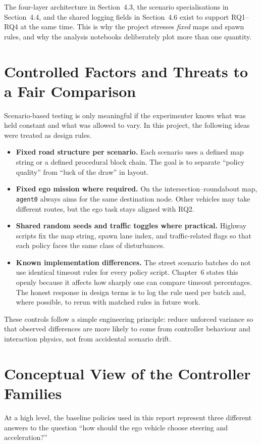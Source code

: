 \documentclass[12pt,a4paper]{report}
\begin{document}
The four-layer architecture in Section~4.3, the scenario specialisations in Section~4.4, and the shared logging fields in Section~4.6 exist to support RQ1--RQ4 at the same time. This is why the project stresses \emph{fixed} maps and spawn rules, and why the analysis notebooks deliberately plot more than one quantity.

\section{Controlled Factors and Threats to a Fair Comparison}
Scenario-based testing is only meaningful if the experimenter knows what was held constant and what was allowed to vary. In this project, the following ideas were treated as design rules.

\begin{itemize}
    \item \textbf{Fixed road structure per scenario.} Each scenario uses a defined map string or a defined procedural block chain. The goal is to separate ``policy quality'' from ``luck of the draw'' in layout.
    \item \textbf{Fixed ego mission where required.} On the intersection--roundabout map, \texttt{agent0} always aims for the same destination node. Other vehicles may take different routes, but the ego task stays aligned with RQ2.
    \item \textbf{Shared random seeds and traffic toggles where practical.} Highway scripts fix the map string, spawn lane index, and traffic-related flags so that each policy faces the same class of disturbances.
    \item \textbf{Known implementation differences.} The street scenario batches do not use identical timeout rules for every policy script. Chapter~6 states this openly because it affects how sharply one can compare timeout percentages. The honest response in design terms is to log the rule used per batch and, where possible, to rerun with matched rules in future work.
\end{itemize}

These controls follow a simple engineering principle: reduce unforced variance so that observed differences are more likely to come from controller behaviour and interaction physics, not from accidental scenario drift.

\section{Conceptual View of the Controller Families}
At a high level, the baseline policies used in this report represent three different answers to the question ``how should the ego vehicle choose steering and acceleration?''
\end{document}
